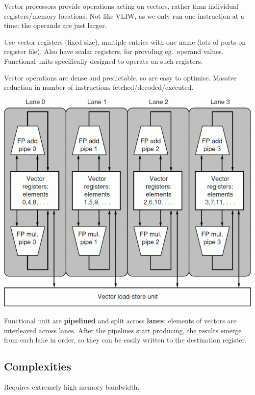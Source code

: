 \documentclass[a4paper, 11pt]{article}
\begin{document}
{
    \begin{minipage}[t]{0.45\textwidth}
    Vector processors provide operations acting on vectors, rather than individual registers/memory locations. Not like VLIW, as we only run one instruction at a time: the operands are just larger.

    Use vector registers (fixed size), multiple entries with one name (lots of ports on register file). Also have scalar registers, for providing eg.\ operand values. Functional units specifically designed to operate on such registers.

    Vector operations are dense and predictable, so are easy to optimise. Massive reduction in number of instructions fetched/decoded/executed.
    \end{minipage}
    \hspace{5mm}
    \begin{minipage}[t]{0.5\textwidth}
    \vspace{0pt}
    \centering
    \includegraphics[width=\textwidth]{vector-lanes.png}
    \end{minipage}

    Functional unit are \textbf{pipelined} and split across \textbf{lanes}: elements of vectors are interleaved across lanes. After the pipelines start producing, the results emerge from each lane in order, so they can be easily written to the destination register.

    \subsection*{Complexities}
    {
        Requires extremely high memory bandwidth.

}}
\end{document}
